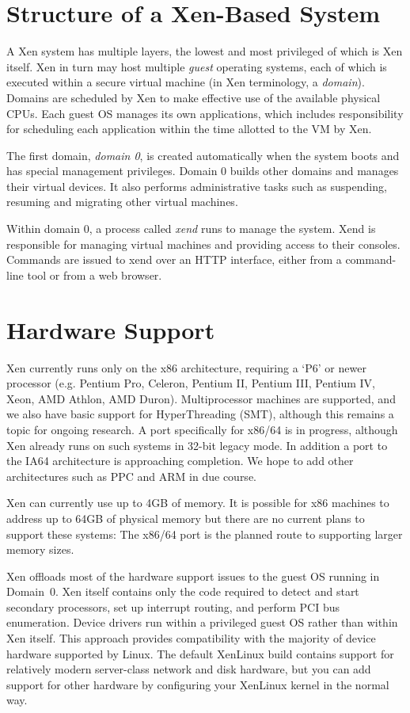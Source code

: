 \documentclass[11pt,twoside,final,openright]{report}
\def\Xend{{Xend}\xspace}
\def\xend{{xend}\xspace}
\begin{document}
\section{Structure of a Xen-Based System}

A Xen system has multiple layers, the lowest and most privileged of
which is Xen itself. 
Xen in turn may host multiple {\em guest} operating systems, each of
which is executed within a secure virtual machine (in Xen terminology,
a {\em domain}). Domains are scheduled by Xen to make effective use of
the available physical CPUs.  Each guest OS manages its own
applications, which includes responsibility for scheduling each
application within the time allotted to the VM by Xen.

The first domain, {\em domain 0}, is created automatically when the
system boots and has special management privileges. Domain 0 builds
other domains and manages their virtual devices. It also performs
administrative tasks such as suspending, resuming and migrating other
virtual machines.

Within domain 0, a process called \emph{xend} runs to manage the system.
\Xend is responsible for managing virtual machines and providing access
to their consoles.  Commands are issued to \xend over an HTTP
interface, either from a command-line tool or from a web browser.

\section{Hardware Support}

Xen currently runs only on the x86 architecture, requiring a `P6' or
newer processor (e.g. Pentium Pro, Celeron, Pentium II, Pentium III,
Pentium IV, Xeon, AMD Athlon, AMD Duron).  Multiprocessor machines are
supported, and we also have basic support for HyperThreading (SMT),
although this remains a topic for ongoing research. A port
specifically for x86/64 is in progress, although Xen already runs on
such systems in 32-bit legacy mode. In addition a port to the IA64
architecture is approaching completion. We hope to add other
architectures such as PPC and ARM in due course.


Xen can currently use up to 4GB of memory.  It is possible for x86
machines to address up to 64GB of physical memory but there are no
current plans to support these systems: The x86/64 port is the
planned route to supporting larger memory sizes.

Xen offloads most of the hardware support issues to the guest OS
running in Domain~0.  Xen itself contains only the code required to
detect and start secondary processors, set up interrupt routing, and
perform PCI bus enumeration.  Device drivers run within a privileged
guest OS rather than within Xen itself. This approach provides
compatibility with the majority of device hardware supported by Linux.
The default XenLinux build contains support for relatively modern
server-class network and disk hardware, but you can add support for
other hardware by configuring your XenLinux kernel in the normal way.
\end{document}
